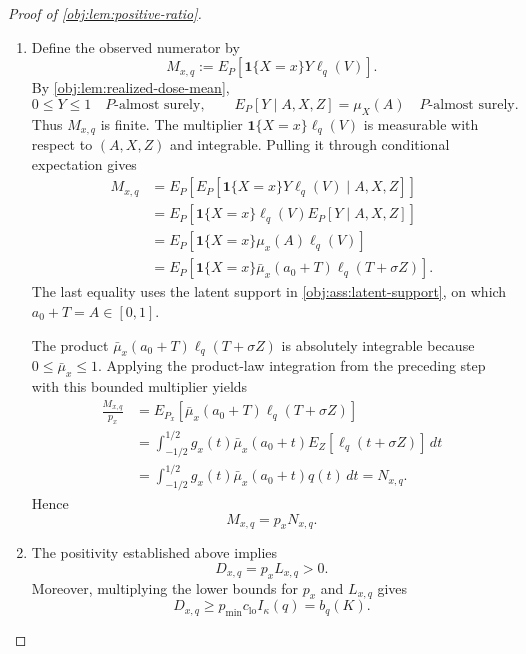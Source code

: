 \begin{proof}[Proof of \cref{obj:lem:positive-ratio}]
\begin{enumerate}
Since \(V=T+\sigma Z\), Fubini's theorem, justified by absolute integrability, and the pointwise Gaussian-inverse identity give
\[
\begin{aligned}
\frac{D_{x,q}}{p_x}
&=E_{P_x}[\ell_q(T+\sigma Z)]\\
&=\int_{-1/2}^{1/2}
g_x(t)E_Z[\ell_q(t+\sigma Z)]\,dt\\
&=\int_{-1/2}^{1/2}g_x(t)q(t)\,dt
=L_{x,q}.
\end{aligned}
\]
Consequently,
\[
D_{x,q}=p_xL_{x,q}.
\]

\item Define the observed numerator by
\[
M_{x,q}:=E_P[\mathbf1\{X=x\}Y\ell_q(V)].
\]
By \cref{obj:lem:realized-dose-mean},
\[
0\le Y\le1\quad P\text{-almost surely},
\qquad
E_P[Y\mid A,X,Z]=\mu_X(A)\quad P\text{-almost surely}.
\]
Thus \(M_{x,q}\) is finite. The multiplier
\(\mathbf1\{X=x\}\ell_q(V)\) is measurable with respect to \((A,X,Z)\) and integrable. Pulling it through conditional expectation gives
\[
\begin{aligned}
M_{x,q}
&=E_P\!\left[
E_P[\mathbf1\{X=x\}Y\ell_q(V)\mid A,X,Z]
\right]\\
&=E_P\!\left[
\mathbf1\{X=x\}\ell_q(V)E_P[Y\mid A,X,Z]
\right]\\
&=E_P[\mathbf1\{X=x\}\mu_x(A)\ell_q(V)]\\
&=E_P[\mathbf1\{X=x\}\bar\mu_x(a_0+T)\ell_q(T+\sigma Z)].
\end{aligned}
\]
The last equality uses the latent support in \cref{obj:ass:latent-support}, on which \(a_0+T=A\in[0,1]\).

The product \(\bar\mu_x(a_0+T)\ell_q(T+\sigma Z)\) is absolutely integrable because \(0\le\bar\mu_x\le1\). Applying the product-law integration from the preceding step with this bounded multiplier yields
\[
\begin{aligned}
\frac{M_{x,q}}{p_x}
&=E_{P_x}[\bar\mu_x(a_0+T)\ell_q(T+\sigma Z)]\\
&=\int_{-1/2}^{1/2}
g_x(t)\bar\mu_x(a_0+t)
E_Z[\ell_q(t+\sigma Z)]\,dt\\
&=\int_{-1/2}^{1/2}
g_x(t)\bar\mu_x(a_0+t)q(t)\,dt
=N_{x,q}.
\end{aligned}
\]
Hence
\[
M_{x,q}=p_xN_{x,q}.
\]

\item The positivity established above implies
\[
D_{x,q}=p_xL_{x,q}>0.
\]
Moreover, multiplying the lower bounds for \(p_x\) and \(L_{x,q}\) gives
\[
D_{x,q}
\ge p_{\min}c_{\mathrm{lo}}I_\kappa(q)
=b_q(K).
\]


\end{enumerate}
\end{proof}
